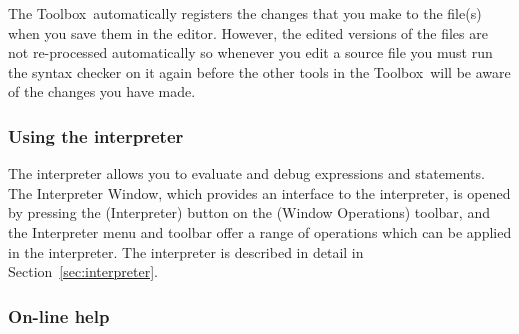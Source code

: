 \documentclass[\pformat,12pt]{article}
\newcommand{\Toolbox}{Toolbox}
\newcommand{\guicmd}[1]{{\sf #1}}
\begin{document}
The \Toolbox\ automatically registers the changes that you make to the
file(s) when you save them in the editor. However, the edited versions
of the files are not re-processed automatically so whenever you edit a
source file you must run the syntax checker on it again before the
other tools in the \Toolbox\ will be aware of the changes you have
made.




\subsubsection{Using the interpreter}

The interpreter allows you to evaluate and debug expressions and
statements. The \guicmd{Interpreter Window}, which provides an
interface to the interpreter, is opened by pressing the 
(\guicmd{Interpreter}) button on the (\guicmd{Window Operations})
toolbar, and the \guicmd{Interpreter} menu and toolbar offer a range
of operations which can be applied in the interpreter. The interpreter
is described in detail in Section~\ref{sec:interpreter}.


\subsubsection{On-line help}
% 
%
\end{document}
